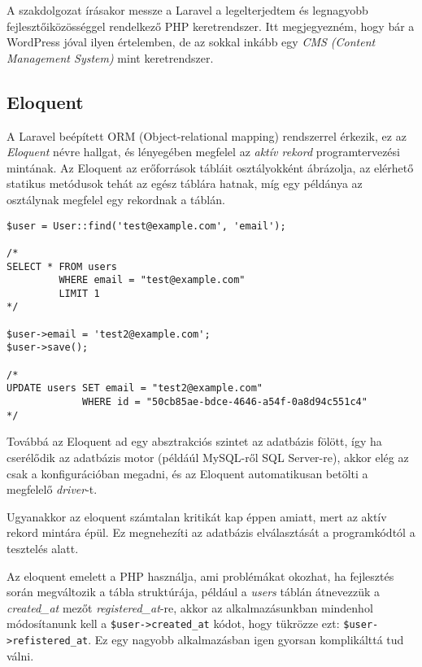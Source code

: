 \documentclass[a4paper,12pt]{thesis-ekf}
\theoremstyle{definition}
\begin{document}
			A szakdolgozat írásakor messze a Laravel a legelterjedtem és legnagyobb fejlesztőiközösséggel rendelkező PHP keretrendszer. Itt megjegyezném, hogy bár a WordPress jóval  ilyen értelemben, de az sokkal inkább egy \emph{CMS (Content Management System)} mint keretrendszer.
			
			\subsection{Eloquent}\label{sc:eloquent}
				A Laravel beépített ORM (Object-relational mapping) rendszerrel érkezik, ez az \emph{Eloquent} névre hallgat, és lényegében megfelel az \emph{aktív rekord} programtervezési mintának. Az Eloquent az erőforrások tábláit osztályokként ábrázolja, az elérhető statikus metódusok tehát az egész táblára hatnak, míg egy példánya az osztálynak megfelel egy rekordnak a táblán.
				
				\pagebreak
				
				\begin{lstlisting}
$user = User::find('test@example.com', 'email'); 

/* 
SELECT * FROM users 
         WHERE email = "test@example.com" 
         LIMIT 1 
*/

$user->email = 'test2@example.com';
$user->save();

/*
UPDATE users SET email = "test2@example.com"
             WHERE id = "50cb85ae-bdce-4646-a54f-0a8d94c551c4"
*/
				\end{lstlisting}
				
				Továbbá az Eloquent ad egy absztrakciós szintet az adatbázis fölött, így ha cserélődik az adatbázis motor (példáúl MySQL-ről SQL Server-re), akkor elég az csak a konfigurációban megadni, és az Eloquent automatikusan betölti a megfelelő \emph{driver}-t.
				
				Ugyanakkor az eloquent számtalan kritikát kap éppen amiatt, mert az aktív rekord mintára épül. Ez megnehezíti az adatbázis elválasztását a programkódtól a tesztelés alatt.
				
				Az eloquent emelett a PHP  használja, ami problémákat okozhat, ha fejlesztés során megváltozik a tábla struktúrája, például a \emph{users} táblán átnevezzük a \emph{created\_at} mezőt \emph{registered\_at}-re, akkor az alkalmazásunkban mindenhol módosítanunk kell a \texttt{\$user->created\_at} kódot, hogy tükrözze ezt: \texttt{\$user->refistered\_at}. Ez egy nagyobb alkalmazásban igen gyorsan komplikálttá tud válni.
				
\end{document}
